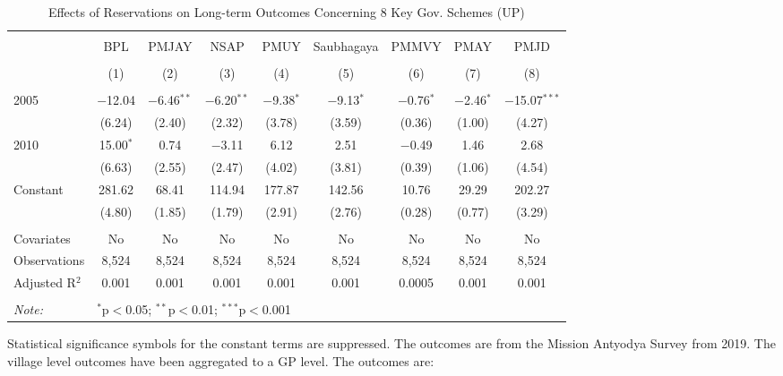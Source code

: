 \begin{table}[!htbp]
\centering
\begin{threeparttable}

  \caption{Effects of Reservations on Long-term Outcomes Concerning 8 Key Gov. Schemes (UP)} 
  \label{up_shrug_schemes_05_10} 
\scriptsize 
\begin{tabular}{@{\extracolsep{0pt}}lcccccccc} 
\\[-1.8ex]\hline 
\hline \\[-1.8ex] 
 & BPL & PMJAY & NSAP & PMUY & Saubhagaya & PMMVY & PMAY & PMJD \\ 
\\[-1.8ex] & (1) & (2) & (3) & (4) & (5) & (6) & (7) & (8)\\ 
\hline \\[-1.8ex] 
 2005 & $-$12.04 & $-$6.46$^{**}$ & $-$6.20$^{**}$ & $-$9.38$^{*}$ & $-$9.13$^{*}$ & $-$0.76$^{*}$ & $-$2.46$^{*}$ & $-$15.07$^{***}$ \\ 
  & (6.24) & (2.40) & (2.32) & (3.78) & (3.59) & (0.36) & (1.00) & (4.27) \\ 
  2010 & 15.00$^{*}$ & 0.74 & $-$3.11 & 6.12 & 2.51 & $-$0.49 & 1.46 & 2.68 \\ 
  & (6.63) & (2.55) & (2.47) & (4.02) & (3.81) & (0.39) & (1.06) & (4.54) \\ 
  Constant & 281.62 & 68.41 & 114.94 & 177.87 & 142.56 & 10.76 & 29.29 & 202.27 \\ 
  & (4.80) & (1.85) & (1.79) & (2.91) & (2.76) & (0.28) & (0.77) & (3.29) \\ 
 \hline \\[-1.8ex] 
Covariates & No & No & No & No & No & No & No & No \\ 
Observations & 8,524 & 8,524 & 8,524 & 8,524 & 8,524 & 8,524 & 8,524 & 8,524 \\ 
Adjusted R$^{2}$ & 0.001 & 0.001 & 0.001 & 0.001 & 0.001 & 0.0005 & 0.001 & 0.001 \\ 
\hline 
\hline \\[-1.8ex] 
\textit{Note:}  & \multicolumn{8}{l}{$^{*}$p$<$0.05; $^{**}$p$<$0.01; $^{***}$p$<$0.001} \\ 
\end{tabular} 
\begin{tablenotes}[flushleft]
\scriptsize
\item[] Statistical significance symbols for the constant terms are suppressed. The outcomes are from the Mission Antyodya Survey from 2019.
                   The village level outcomes have been aggregated to a GP level. The outcomes are:

\end{tablenotes}
\end{threeparttable}
\end{table}
